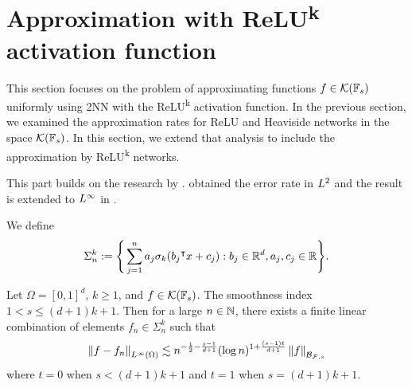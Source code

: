 


\section{Approximation with ReLU\textsuperscript{k} activation function}

This section focuses on the problem of approximating functions $f\in
\mathcal{K}(\mathbb{F}_s)$ uniformly using 2NN with the ReLU\textsuperscript{k}
activation function. In the previous section, we examined the approximation
rates for ReLU and Heaviside networks in the space $\mathcal{K}(\mathbb{F}_s)$. In
this section, we extend that analysis to include the approximation by
ReLU\textsuperscript{k} networks. 

This part builds on the research by
\cite{klusowskiApproximationCombinationsReLU2018}.
\cite{siegelHighOrderApproximationRates2021} obtained the error rate in $L^{2}$
and the result is extended to $L^{\infty}$ in
\cite{maUniformApproximationRates2022}.


We define 
\begin{equation}
    \Sigma_n^k := \Bigg\{
        \sum_{j=1}^n a_j \sigma_k(b_j{}^{\intercal} x + c_j): 
        b_j \in \mathbb{R}^d, a_j, c_j \in \mathbb{R}
    \Bigg\}.
\end{equation}

\begin{theorem}
    Let $\Omega = [0,1]^d$, $k \geq 1$, and $f \in \mathcal{K}(\mathbb{F}_s)$. The
    smoothness index $1 < s \leq (d+1)k + 1$. Then for a large $n \in \mathbb{N}$,
    there exists a finite linear combination of elements $f_n \in \Sigma_n^k$
    such that
    \begin{equation}
        \left\| f-f_n \right\|_{L^{\infty}(\Omega)} \lesssim 
        n^{-\frac{1}{2} - \frac{s-1}{d+1}}
        (\log{n})^{1 + \frac{(s-1)t}{d+1}}
        \left\| f \right\|_{\mathcal{B}_{\mathcal{F},s}}
    \end{equation}
    where $t=0$ when $s < (d+1)k+1$ and $t=1$ when $s = (d+1)k+1$.
\end{theorem}

